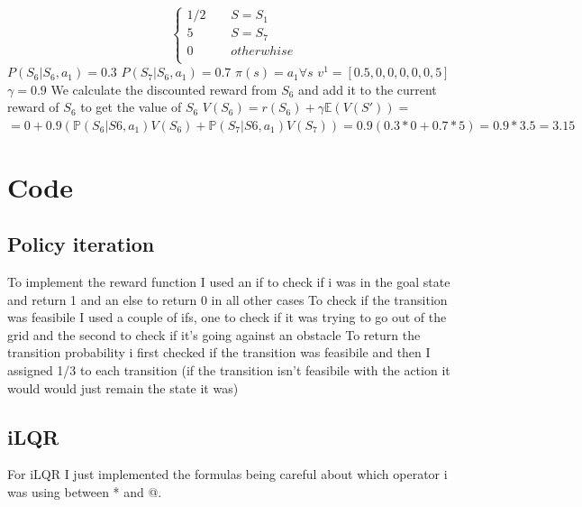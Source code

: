 \documentclass[10pt,a4paper]{article}
\begin{document}
\begin{equation*}
    \begin{cases*}
        1/2 \:\;\:\;\:\;\:\; S = S_{1}  \\
        5   \:\;\:\;\:\;\:\;\:\;\:\; S = S_{7}  \\
        0   \:\;\:\;\:\;\:\;\:\;\:\; otherwhise \\
    \end{cases*}
\end{equation*}
\newline
$P(S_{6}|S_{6},a_{1}) = 0.3 $ \newline
$P(S_{7}|S_{6},a_{1}) = 0.7 $ \newline
$\pi(s) = a_{1} \forall s $
$v^1 = [0.5, 0, 0, 0, 0, 0, 5] $
$\gamma = 0.9 $
\newline
We calculate the discounted reward from $S_{6}$ and add it to the current reward of $S_{6}$ to get the value of $S_{6}$ \newline
$ V(S_{6}) = r(S_{6}) + \gamma \mathbb{E}(V(S')) =  $\newline
$= 0 + 0.9 (\mathbb{P}(S_{6}|S{6,a_{1}}) V(S_{6}) + \mathbb{P}(S_{7}|S{6,a_{1}}) V(S_{7}) ) = 0.9(0.3 *0 + 0.7 * 5 ) = 0.9 * 3.5 = 3.15 $
\newpage
\section*{Code}

\subsection*{Policy iteration}
To implement the reward function I used an if to check if i was in the goal state and return 1 and an else to return 0 in all other cases
\newline
To check if the transition was feasibile I used a couple of ifs, one to check if it was trying to go out of the grid and the second to check if it's going against an obstacle 
\newline
To return the transition probability i first checked if the transition was feasibile and then I assigned 1/3 to each transition (if the transition isn't feasibile with the action it would would just remain the state it was)

\subsection*{iLQR}
For iLQR I just implemented the formulas being careful about which operator i was using between * and @.
\end{document}
